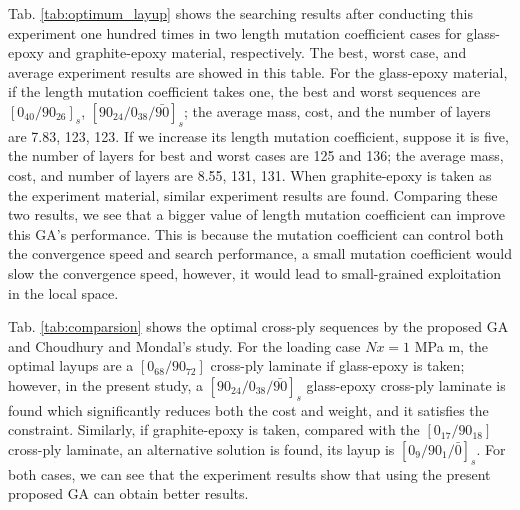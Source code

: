 Tab. \ref{tab:optimum_layup} shows the searching results after conducting this
experiment one hundred times in two length mutation coefficient cases for
glass-epoxy and graphite-epoxy material, respectively. The best, worst case, and
average experiment results are showed in this table.  For the glass-epoxy
material, if the length mutation coefficient takes one, the best and worst
sequences are $[0_{40}/90_{26}]_s$, $[90_{24}/0_{38}/\bar{90}]_s$; the average mass, cost,
and the number of layers are 7.83, 123, 123. If we increase its length mutation
coefficient, suppose it is five, the number of layers for best and worst cases
are 125 and 136;  the average mass, cost, and number of layers are 8.55, 131,
131.  When graphite-epoxy is taken as the experiment material, similar
experiment results are found.  Comparing these two results, we see that a
bigger value of length mutation coefficient can improve this GA's performance.
This is because the mutation coefficient can control both the convergence speed
and search performance, a small mutation coefficient would slow the convergence
speed, however, it would lead to small-grained exploitation in the local space. 



Tab. \ref{tab:comparsion} shows the optimal cross-ply sequences by the
proposed GA and  Choudhury and Mondal's\cite{choudhury2019failure} study. For
the loading case $Nx=1$ MPa m, the optimal layups are a $[0_{68}/90_{72}]$
cross-ply laminate if glass-epoxy is taken; however, in the present study, a
$[90_{24}/0_{38}/\bar{90}]_s$ glass-epoxy cross-ply laminate is found which
significantly reduces both the cost and weight, and it satisfies the
constraint.  Similarly, if graphite-epoxy is taken, compared with the
$[0_{17}/90_{18}]$ cross-ply laminate, an alternative solution is found,
its layup is $[0_{9}/90_{1}/\bar{0}]_s$. For both cases, we can see that the
experiment results show that using the present proposed GA can obtain better
results.

